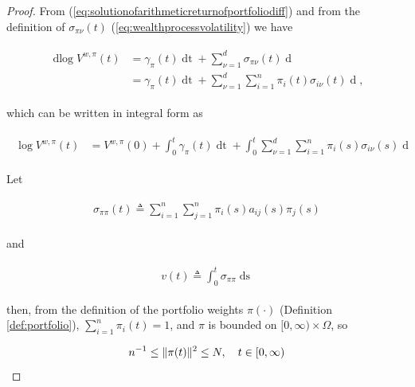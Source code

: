 \documentclass[british]{amsart} \usepackage{lmodern}
\numberwithin{equation}{section} \numberwithin{figure}{section}
\theoremstyle{plain} \newtheorem{thm}{\protect\theoremname}[section]
\theoremstyle{definition} \newtheorem{defn}[thm]{\protect\definitionname}
\theoremstyle{plain} \newtheorem{assumption}[thm]{\protect\assumptionname}
\theoremstyle{plain} \newtheorem{lem}[thm]{\protect\lemmaname}
\theoremstyle{plain} \newtheorem{prop}[thm]{\protect\propositionname}
\theoremstyle{remark} \newtheorem{rem}[thm]{\protect\remarkname}
\theoremstyle{plain} \newtheorem{cor}[thm]{\protect\corollaryname}
\renewcommand{\d}[1]{\mathop{\mathrm{d}{#1}}}
\newcommand{\defeq}{\mathop{\triangleq}} \newcommand{\almostsurely}{\text{a.s.}}
\newcommand{\V}{V^{w,\pi}}
\begin{document}
\begin{proof}
  From (\ref{eq:solutionofarithmeticreturnofportfoliodiff}) and from the
  definition of $\sigma_{\pi\nu}(t)$ (\ref{eq:wealthprocessvolatility}) 
  we have

  \begin{gather*}
    \begin{split}
    \d\log{\V(t)} 
      &= \gamma_{\pi}(t) \d{t} +
         \sum_{\nu=1}^{d} \sigma_{\pi\nu}(t) \d{W_{\nu}(t)} \\
      &= \gamma_{\pi}(t) \d{t} +
         \sum_{\nu=1}^{d} \sum_{i=1}^{n} \pi_{i}(t) \sigma_{i\nu}(t)\d{W_{\nu}(t)},
    \end{split}
  \end{gather*}

  which can be written in integral form as

  \begin{gather*}
    \begin{split}
    \log{\V(t)} 
      &= \V(0) + \int_{0}^{t} \gamma_{\pi}(t) \d{t} +
         \int_{0}^{t} \sum_{\nu=1}^{d} \sum_{i=1}^{n} \pi_{i}(s) \sigma_{i\nu}(s)\d{W_{\nu}(s)}
    \end{split}
  \end{gather*}

  Let

  \begin{gather*}
    \begin{split}
      \sigma_{\pi\pi}(t) \defeq \sum_{i=1}^{n} \sum_{j=1}^{n} \pi_{i}(s)a_{ij}(s)\pi_{j}(s)
    \end{split}
  \end{gather*}

  and

   \begin{gather*}
    \begin{split}
      v(t) \defeq \int_{0}^{t} \sigma_{\pi\pi} \d{s}
    \end{split}
  \end{gather*}

  then, from the definition of the portfolio weights $\pi(\cdot)$ (Definition
\ref{def:portfolio}), $\sum_{i=1}^{n} \pi_{i}(t) = 1$, and $\pi$ is bounded on $[0,
\infty) \times \Omega$, so 

   \begin{gather*}
    \begin{split}
      n^{-1} \le \| \pi(t) \|^{2}  \le N, \quad t\in[0,\infty)
    \end{split}
  \end{gather*}


\end{proof}
\end{document}
